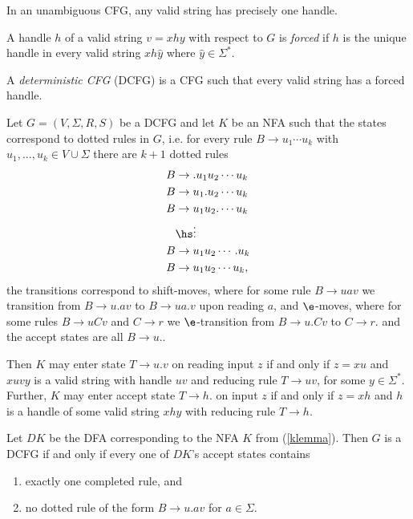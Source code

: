 \documentclass{article}
\begin{document}
\begin{lemma}[Sipser p. 137]
	In an unambiguous CFG, any valid string has precisely one handle.
\end{lemma}

\begin{definition}
	A handle $h$ of a valid string $v=xhy$ with respect to $G$ is \emph{forced} if $h$ is
	the unique handle in every valid string $xh\hat y$ where $\hat y\in\Sigma^*$.
\end{definition}

\begin{definition}
	A \emph{deterministic CFG} (DCFG) is a CFG such that every valid string has a forced handle.
\end{definition}

\begin{lemma}[Sipser p. 140]
	\label{klemma}
	Let $G=(V,\Sigma,R,S)$ be a DCFG and let $K$ be an NFA such that the states correspond to
	dotted rules in $G$, i.e. for every rule $B\to u_1\cdots u_k$ with $u_1,...,u_k\in V\cup\Sigma$
	there are $k+1$ dotted rules
	\begin{align*}
		B & \to .u_1u_2\cdots u_k \\
		B & \to u_1.u_2\cdots u_k \\
		B & \to u_1u_2.\cdots u_k \\
		  & \hs\vdots             \\
		B & \to u_1u_2\cdots .u_k \\
		B & \to u_1u_2\cdots u_k,
	\end{align*}
	the transitions correspond to shift-moves, where for some rule $B\to uav$ we transition from
	$B\to u.av$ to $B\to ua.v$ upon reading $a$, and $\e$-moves, where for some rules
	$B\to uCv$ and $C\to r$ we $\e$-transition from $B\to u.Cv$ to $C\to r.$ and the accept states
	are all $B\to u.$.

	Then $K$ may enter state $T\to u.v$ on reading input $z$ if and only if $z=xu$ and
	$xuvy$ is a valid string with handle $uv$ and reducing rule $T\to uv$, for some $y\in\Sigma^*$.
	Further, $K$ may enter accept state $T\to h.$ on input $z$ if and only if $z=xh$ and $h$ is a
	handle of some valid string $xhy$ with reducing rule $T\to h$.
\end{lemma}

\begin{theorem}
	Let $DK$ be the DFA corresponding to the NFA $K$ from (\ref{klemma}). Then $G$ is a
	DCFG if and only if every one of $DK$'s accept states contains
	\begin{enumerate}
		\item exactly one completed rule, and
		\item no dotted rule of the form $B\to u.av$ for $a\in\Sigma$.
	\end{enumerate}
\end{theorem}
\end{document}
